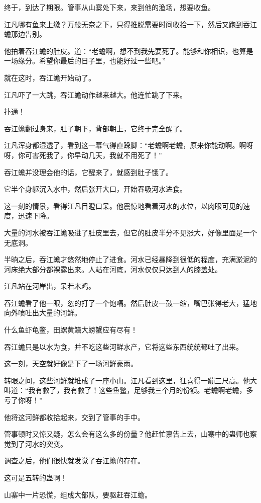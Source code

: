 \begin{this_body}
终于，到达了期限。管事从山寨处下来，来到他的渔场，想要收鱼。

江凡哪有鱼来上缴？万般无奈之下，只得推脱需要时间收拾一下，然后又跑到吞江蟾那边告别。

他拍着吞江蟾的肚皮。道：“老蟾啊，想不到我先要死了。能够和你相识，也算是一场缘分。希望你最后的日子里，也能好过一些吧。”

就在这时，吞江蟾开始动了。

江凡吓了一大跳，吞江蟾动作越来越大。他连忙跳了下来。

扑通！

吞江蟾翻过身来，肚子朝下，背部朝上，它终于完全醒了。

江凡浑身都湿透了，看到这一幕气得直跺脚：“老蟾啊老蟾，原来你能动啊。啊呀呀，你可害死我了，你早动几天，我就不用死了！”

吞江蟾并没理会他的话，它醒来了，就感到肚子饿了。

它半个身躯沉入水中，然后张开大口，开始吞吸河水进食。

这一刻的情景，看得江凡目瞪口呆。他震惊地看着河水的水位，以肉眼可见的速度，迅速下降。

大量的河水被吞江蟾吸进了肚皮里去，但它的肚皮半分不见涨大，好像里面是一个无底洞。

半晌之后，吞江蟾才悠然地停止了进食。河水已经暴降到很低的程度，充满淤泥的河床绝大部分都裸露出来。人站在河底，河水仅仅只达到人的膝盖处。

江凡站在河岸出，呆若木鸡。

吞江蟾看了他一眼，忽的打了一个饱嗝。然后肚皮一鼓一缩，嘴巴张得老大，猛地向外喷吐出大量的河鲜。

什么鱼虾龟鳖，田螺黄鳝大螃蟹应有尽有！

吞江蟾只是以水为食，并不吃这些河鲜水产，它将这些东西统统都吐了出来。

这一刻，天空就好像是下了一场河鲜豪雨。

转眼之间，这些河鲜就堆成了一座小山。江凡看到这里，狂喜得一蹦三尺高。他大叫道：“我有救了，我有救了！这些鱼鳖，足够我三个月的份额。老蟾啊老蟾，多亏了你呀！”

他将这河鲜都收拾起来，交到了管事的手中。

管事顿时又惊又疑，怎么会有这么多的份量？他赶忙禀告上去，山寨中的蛊师也察觉到了河水的突变。

调查之后，他们很快就发觉了吞江蟾的存在。

这可是五转的蛊啊！

山寨中一片恐慌，组成大部队，要驱赶吞江蟾。


\end{this_body}
